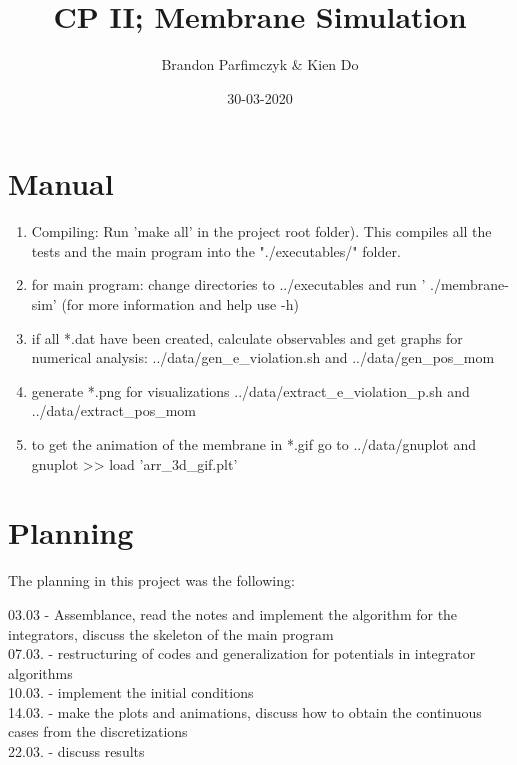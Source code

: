 \documentclass[11pt,a4paper]{article}
\title{CP II; Membrane Simulation}
\author{Brandon Parfimczyk \& Kien Do}
\date{30-03-2020}
\begin{document}
\maketitle

\tableofcontents
\newpage

\section{Manual}

\begin{enumerate}
\item Compiling: Run 'make all' in the project root folder). This compiles all
	the tests and the main program into the "./executables/" folder.
\item for main program: change directories to ../executables and run '
	./membrane-sim' (for more information and help use -h) 
\item if all *.dat have been created, calculate observables and get graphs for
	numerical analysis: ../data/gen\_e\_violation.sh and ../data/gen\_pos\_mom 
\item generate *.png for visualizations ../data/extract\_e\_violation\_p.sh and
	../data/extract\_pos\_mom 
\item to get the animation of the membrane in *.gif go to ../data/gnuplot and
	gnuplot >> load 'arr\_3d\_gif.plt'
\end{enumerate}

\section{Planning}

The planning in this project was the following:

03.03 - Assemblance, read the notes and implement the algorithm for the integrators, discuss the skeleton of the main program\\

07.03. - restructuring of codes and generalization for potentials in integrator algorithms\\

10.03. - implement the initial conditions\\

14.03. - make the plots and animations, discuss how to obtain the continuous cases from the discretizations\\

22.03. - discuss results\\
\end{document}
